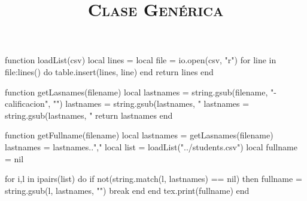 \begin{luacode*}
    function loadList(csv)
        local lines = {}
        local file = io.open(csv, "r")
        for line in file:lines() do
            table.insert(lines, line)
        end
        return lines
    end
        
    function getLasnames(filename)
       local lastnames = string.gsub(filename, "-calificacion", "") 
       lastnames = string.gsub(lastnames, "%
       lastnames = string.gsub(lastnames, "%
       return lastnames
    end

    function getFullname(filename)
       local lastnames = getLasnames(filename)
       lastnames = lastnames..","
       local list = loadList("../students.csv") 
       local fullname = nil

       for i,l in ipairs(list) do
            if not(string.match(l, lastnames) == nil) then
                fullname = string.gsub(l, lastnames, "")
                break
            end
        end
       tex.print(fullname)
    end

\end{luacode*}

\title{\Large{\textsc{Clase Genérica}} \\ \LARGE{\work}}
\author{\fullname}
